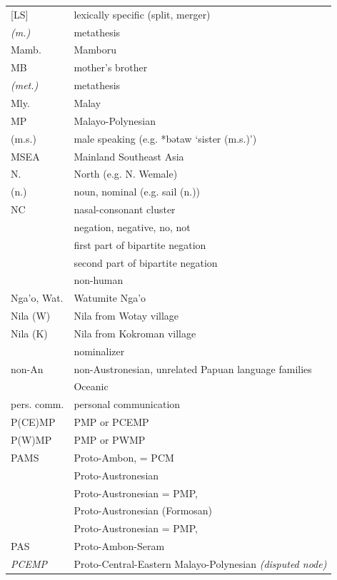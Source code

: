 {\begin{xltabular}{\textwidth}[l]{l>{\raggedright\arraybackslash}X}
{[LS]}	&	lexically specific (split, merger)	\\
\it{(m.)}	&	metathesis	\\
Mamb.	&	Mamboru	\\
MB	&	mother's brother	\\
\it{(met.)}	&	metathesis	\\	
Mly.	&	Malay \\	
MP	&	Malayo-Polynesian	\\
(m.s.)	&	male speaking (e.g. *bətaw ‘sister (m.s.)’)	\\
MSEA	&	Mainland Southeast Asia	\\
N.	&	North (e.g. N. Wemale)	\\
(n.)	&	noun, nominal (e.g. sail (n.))	\\
NC	&	nasal-consonant cluster	\\
	&	negation, negative, no, not	\\
	&	first part of bipartite negation	\\
	&	second part of bipartite negation	\\
	&	non-human 	\\
Nga'o, Wat.	&	Watumite Nga'o	\\
Nila (W)	&	Nila from Wotay village	\\
Nila (K)	&	Nila from Kokroman village	\\
	&	nominalizer	\\
non-An	&	non-Austronesian, unrelated Papuan language families	\\
	&	Oceanic	\\
pers. comm.	&	personal communication	\\
P(CE)MP	&	PMP or PCEMP	\\
P(W)MP	&	PMP or PWMP	\\
PAMS	&	Proto-Ambon, \citet{Stresemann1927} = PCM	\\
	&	Proto-Austronesian	\\
	&	Proto-Austronesian = PMP, \citet{Dempwolff1938}	\\
	&	Proto-Austronesian (Formosan)	\\
	&	Proto-Austronesian = PMP, \citet{Stresemann1927}	\\
PAS	&	Proto-Ambon-Seram	\\
\it{PCEMP}	&	Proto-Central-Eastern Malayo-Polynesian \it{(disputed node)}	\\

\end{xltabular}}
